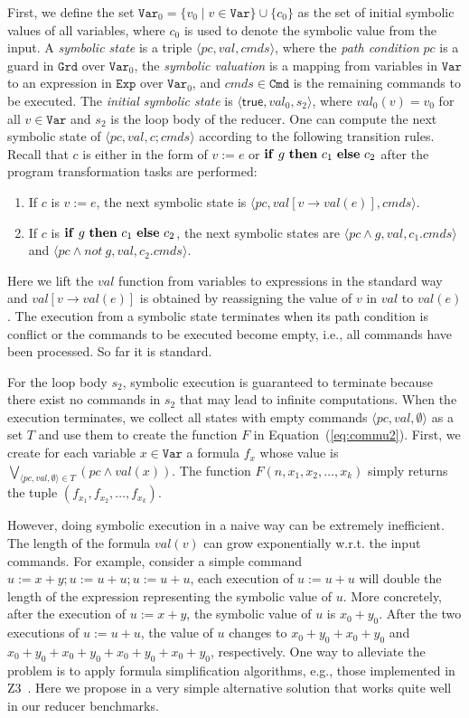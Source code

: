 \documentclass{llncs}
\newcommand{\Var}{\mathtt{Var}}
\newcommand{\Exp}{\mathtt{Exp}}
\newcommand{\Cmd}{\mathtt{Cmd}}
\newcommand{\Grd}{\mathtt{Grd}}
\newcommand{\true}{\mathsf{true}}
\newcommand{\ite}[3]{
	 \ifmmode
	 \mathbf{if}\ #1 \ \mathbf{then}\ #2\  \mathbf{else}\ #3
	 \else
	 \textbf{if}\ #1 \ \textbf{then}\ #2\  \textbf{else}\ #3
	 \fi}
\begin{document}
First, we define the set $\Var_0=\{v_0 \mid v \in \Var \}\cup \{c_0\}$ as the set of initial symbolic values of all variables, where $c_0$ is used to denote the symbolic value from the input.
A \emph{symbolic state} is a triple $\langle pc, val, cmds \rangle$, where the \emph{path condition} $pc$ is a guard in $\Grd$ over $\Var_0$, the \emph{symbolic valuation} is a mapping from variables in $\Var$ to an expression in $\Exp$ over $\Var_0$, and $cmds\in \Cmd$ is the remaining commands to be executed. The \emph{initial symbolic state} is $\langle \true, val_0, s_2\rangle$, where $val_0(v) = v_0$ for all $v\in\Var$ and $s_2$ is the loop body of the reducer.
One can compute the next symbolic state of $\langle pc, val, c;cmds \rangle$ according to the following transition rules. Recall that $c$ is either in the form of $v:= e$ or $\ite{g}{c_1}{c_2}$ after the program transformation tasks are performed:
\begin{enumerate}
	\item If $c$ is $v:= e$, the next symbolic state is $\langle pc, val[v \rightarrow val(e) ], cmds \rangle$.
	\item If $c$ is $\ite{g}{c_1}{c_2}$, the next symbolic states are $\langle pc\wedge g, val, c_1.cmds \rangle$ and $\langle pc\wedge not\  g, val, c_2.cmds \rangle$.
\end{enumerate}

Here we lift the $val$ function from variables to expressions in the standard way and $val[v \rightarrow val(e) ]$ is obtained by reassigning the value of $v$ in $val$ to $val(e)$. The execution from a symbolic state terminates when its path condition is conflict or the commands to be executed become empty, i.e., all commands have been processed. So far it is standard.

For the loop body $s_2$, symbolic execution is guaranteed to terminate because there exist no commands in $s_2$ that may lead to infinite computations.
When the execution terminates, we collect all states with empty commands $\langle pc, val, \emptyset \rangle$ as a set $T$ and use them to create the function $F$ in Equation~(\ref{eq:commu2}).
First, we create for each variable $x\in\Var$ a formula $f_x$ whose value is $\bigvee_{\langle pc, val, \emptyset \rangle \in T} (pc \wedge val(x))$.
The function $F(n,x_1,x_2,\ldots,x_k)$ simply returns the tuple $(f_{x_1},f_{x_2},\ldots, f_{x_k})$.

However, doing symbolic execution in a naive way can be extremely inefficient.
The length of the formula $val(v)$ can grow exponentially w.r.t. the input commands. For example, consider a simple command $u:=x+y;u:=u+u;u:=u+u$, each execution of $u:= u+ u$ will double the length of the expression representing the symbolic value of $u$. More concretely, after the execution of $u:=x+y$, the symbolic value of $u$ is $x_0+y_0$. After the two executions of $u:=u+u$, the value of $u$ changes to $x_0+y_0+x_0+y_0$ and $x_0+y_0+x_0+y_0+x_0+y_0+x_0+y_0$, respectively. One way to alleviate the problem is to apply formula simplification algorithms, e.g., those implemented in Z3~\cite{z3}.
Here we propose in a very simple alternative solution that works quite well in our reducer benchmarks.
\end{document}
